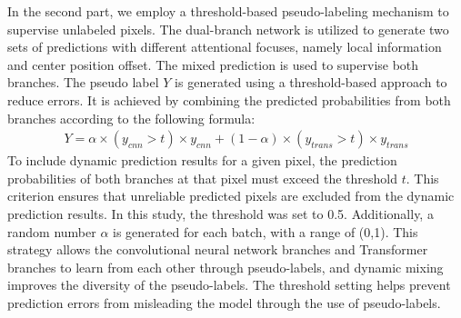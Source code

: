 \documentclass[sigconf,natbib=false]{acmart}
\begin{document}
In the second part, we employ a threshold-based pseudo-labeling mechanism to supervise unlabeled pixels. The dual-branch network is utilized to generate two sets of predictions with different attentional focuses, namely local information and center position offset. The mixed prediction is used to supervise both branches. The pseudo label $Y$ is generated using a threshold-based approach to reduce errors. It is achieved by combining the predicted probabilities from both branches according to the following formula:
\begin{eqnarray}
Y = \alpha \times (y_{cnn}>t) \times y_{cnn}+(1-\alpha) \times (y_{trans}>t) \times y_{trans}
\end{eqnarray}
To include dynamic prediction results for a given pixel, the prediction probabilities of both branches at that pixel must exceed the threshold $t$. This criterion ensures that unreliable predicted pixels are excluded from the dynamic prediction results. In this study, the threshold was set to 0.5. Additionally, a random number $\alpha$ is generated for each batch, with a range of (0,1). This strategy allows the convolutional neural network branches and Transformer branches to learn from each other through pseudo-labels, and dynamic mixing improves the diversity of the pseudo-labels. The threshold setting helps prevent prediction errors from misleading the model through the use of pseudo-labels.
\end{document}
